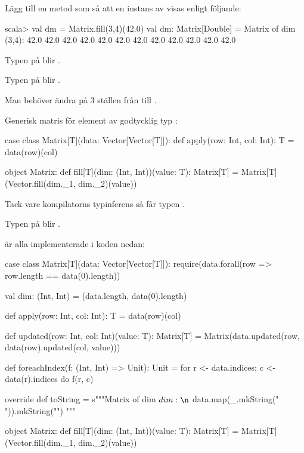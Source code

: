 \Subtask Lägg till en metod  som så att en instans av  visas enligt följande:
\begin{REPLnonum}
scala> val dm = Matrix.fill(3,4)(42.0)
val dm: Matrix[Double] =
Matrix of dim (3,4):
42.0 42.0 42.0 42.0
42.0 42.0 42.0 42.0
42.0 42.0 42.0 42.0
\end{REPLnonum}


\SOLUTION


\TaskSolved \what

\SubtaskSolved Typen på  blir .

\SubtaskSolved Typen på  blir .

\SubtaskSolved Man behöver ändra på 3 ställen från  till .

\SubtaskSolved Generisk matris  för element av godtycklig typ :

\begin{CodeSmall}
case class Matrix[T](data: Vector[Vector[T]]):
  def apply(row: Int, col: Int): T = data(row)(col)

object Matrix:
  def fill[T](dim: (Int, Int))(value: T): Matrix[T] =
    Matrix[T](Vector.fill(dim._1, dim._2)(value))
\end{CodeSmall}

\SubtaskSolved Tack vare kompilatorns typinferens så får  typen .

\SubtaskSolved Typen på  blir .

\noindent \SubtaskSolved \SubtaskSolved \SubtaskSolved \SubtaskSolved \SubtaskSolved är alla implementerade i koden nedan: \vspace{-0.5em}
\begin{CodeSmall}
case class Matrix[T](data: Vector[Vector[T]]):
  require(data.forall(row => row.length == data(0).length))

  val dim: (Int, Int) = (data.length, data(0).length)

  def apply(row: Int, col: Int): T = data(row)(col)

  def updated(row: Int, col: Int)(value: T): Matrix[T] =
    Matrix(data.updated(row, data(row).updated(col, value)))

  def foreachIndex(f: (Int, Int) => Unit): Unit =
    for r <- data.indices; c <- data(r).indices do f(r, c)

  override def toString =
    s"""Matrix of dim $dim:\n${ data.map(_.mkString(" ")).mkString("\n") }"""

object Matrix:
  def fill[T](dim: (Int, Int))(value: T): Matrix[T] =
    Matrix[T](Vector.fill(dim._1, dim._2)(value))

\end{CodeSmall}


